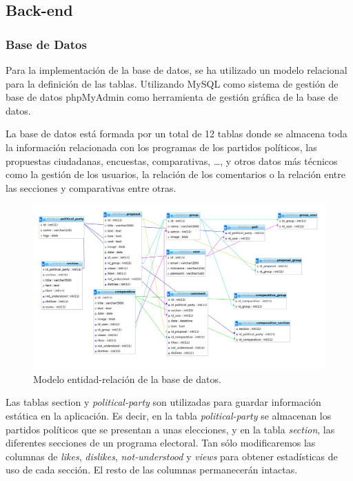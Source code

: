 	\subsection{Back-end}

  		\subsubsection{Base de Datos}\label{sssec:database}
Para la implementación de la base de datos, se ha utilizado un modelo relacional para la definición de las tablas. Utilizando MySQL \cite{ref:MySQL} como sistema de gestión de base de datos phpMyAdmin \cite{ref:phpMyAdmin} como herramienta de gestión gráfica de la base de datos.

La base de datos está formada por un total de 12 tablas donde se almacena toda la información relacionada con los programas de los partidos políticos, las propuestas ciudadanas, encuestas, comparativas, …, y otros datos más técnicos como la gestión de los usuarios, la relación de los comentarios o la relación entre las secciones y comparativas entre otras.

	\begin{figure}[H]
      \centering
	\includegraphics[keepaspectratio, scale=0.30]{Media/Captures/database.png}
      \caption{Modelo entidad-relación de la base de datos.}
      \label{fig:ermodel}
    \end{figure}
    
Las tablas section y \textit{political-party} son utilizadas para guardar información estática en la aplicación. Es decir, en la tabla \textit{political-party} se almacenan los partidos políticos que se presentan a unas elecciones, y en la tabla \textit{section}, las diferentes secciones de un programa electoral. Tan sólo modificaremos las columnas de \textit{likes}, \textit{dislikes}, \textit{not-understood} y \textit{views} para obtener estadísticas de uso de cada sección. El resto de las columnas permanecerán intactas.

